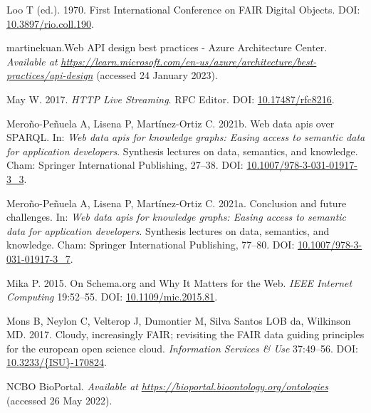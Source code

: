 \begin{CSLReferences}{1}{0}
\leavevmode{}%
Loo T (ed.). 1970. First International Conference on FAIR Digital Objects. DOI: \href{https://doi.org/10.3897/rio.coll.190}{10.3897/rio.coll.190}.

\leavevmode{}%
martinekuan.Web API design best practices - Azure Architecture Center. \emph{Available at} \href{https://learn.microsoft.com/en-us/azure/architecture/best-practices/api-design}{\emph{https://learn.microsoft.com/en-us/azure/architecture/best-practices/api-design}} (accessed 24 January 2023).

\leavevmode{}%
May W. 2017. \emph{HTTP Live Streaming}. RFC Editor. DOI: \href{https://doi.org/10.17487/rfc8216}{10.17487/rfc8216}.

\leavevmode{}%
Meroño-Peñuela A, Lisena P, Martínez-Ortiz C. 2021b. Web data apis over SPARQL. In: \emph{Web data apis for knowledge graphs: Easing access to semantic data for application developers}. Synthesis lectures on data, semantics, and knowledge. Cham: Springer International Publishing, 27--38. DOI: \href{https://doi.org/10.1007/978-3-031-01917-3_3}{10.1007/978-3-031-01917-3\_3}.

\leavevmode{}%
Meroño-Peñuela A, Lisena P, Martínez-Ortiz C. 2021a. Conclusion and future challenges. In: \emph{Web data apis for knowledge graphs: Easing access to semantic data for application developers}. Synthesis lectures on data, semantics, and knowledge. Cham: Springer International Publishing, 77--80. DOI: \href{https://doi.org/10.1007/978-3-031-01917-3_7}{10.1007/978-3-031-01917-3\_7}.

\leavevmode{}%
Mika P. 2015. On Schema.org and Why It Matters for the Web. \emph{IEEE Internet Computing} 19:52--55. DOI: \href{https://doi.org/10.1109/mic.2015.81}{10.1109/mic.2015.81}.

\leavevmode{}%
Mons B, Neylon C, Velterop J, Dumontier M, Silva Santos LOB da, Wilkinson MD. 2017. Cloudy, increasingly FAIR; revisiting the FAIR data guiding principles for the european open science cloud. \emph{Information Services \& Use} 37:49--56. DOI: \href{https://doi.org/10.3233/\%7BISU\%7D-170824}{10.3233/\{ISU\}-170824}.

\leavevmode{}%
NCBO BioPortal. \emph{Available at} \href{https://bioportal.bioontology.org/ontologies}{\emph{https://bioportal.bioontology.org/ontologies}} (accessed 26 May 2022).


\end{CSLReferences}
